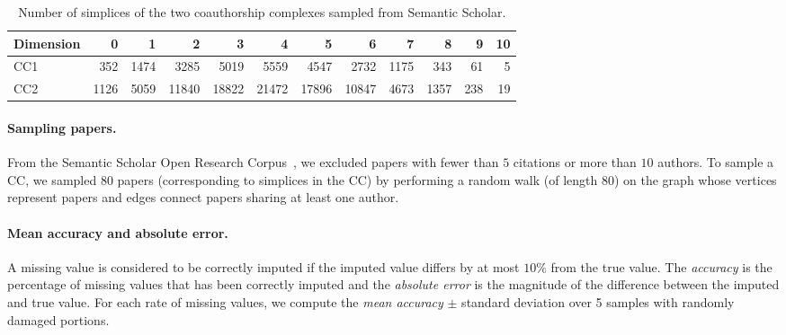 \begin{table}[htbp]
  \centering
  \scriptsize{
  \begin{tabular}{lrrrrrrrrrrr}
    \toprule
    Dimension   & 0     & 1  & 2     & 3 & 4     & 5 & 6    & 7 & 8   & 9 & 10\\
    \midrule
    CC1 & 352  & 1474  & 3285  & 5019  & 5559  & 4547  & 2732  & 1175  & 343 & 61 & 5\\
    CC2 & 1126 & 5059 & 11840 & 18822 & 21472 & 17896  & 10847 & 4673 & 1357 & 238 & 19\\
    \bottomrule
  \end{tabular}}
  \vspace{2pt}
  \caption{%
  Number of simplices of the two coauthorship complexes sampled from Semantic Scholar.
  } \label{table:Simplices-coauthor}
\end{table}

\paragraph{Sampling papers.}
From the Semantic Scholar Open Research Corpus~\cite{ammar18NAACL}, we excluded papers with fewer than $5$ citations or more than $10$ authors.
To sample a CC, we sampled $80$ papers (corresponding to  simplices in the CC) by performing a random walk (of length $80$) on the graph whose vertices represent papers and edges connect papers sharing at least one author.

\paragraph{Mean accuracy and absolute error.}
A missing value is considered to be correctly imputed if the imputed value differs by at most $10\%$ from the true value.
The \emph{accuracy} is the percentage of missing values that has been correctly imputed and the \emph{absolute error} is the magnitude of the difference between the imputed and true value.
For each rate of missing values, we compute the \emph{mean accuracy} $\pm$ standard deviation over 5 samples with randomly damaged portions.
